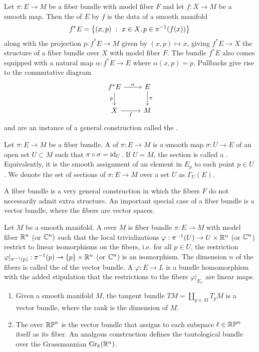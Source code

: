 \begin{defn}
Let $\pi : E \to M$ be a fiber bundle with model fiber $F$
and let $f : X \to M$ be a smooth map. Then the  of $E$ by $f$ is
the data of a smooth manifold
\[
f^*E = \left\lbrace (x, p)~:~ x \in X, p \in \pi^{-1}(f(x))  \right\rbrace
\]
along with the projection $p : f^*E \to M$ given by $(x,p) \mapsto x$, giving
$f^*E \to X$ the structure of a fiber bundle over $X$ with model fiber $F$.
The bundle $f^*E$ also comes equipped with a natural map $\alpha : f^*E \to E$
where $\alpha(x,p) = p$. Pullbacks give rise to the commutative diagram
\[\begin{tikzcd}
f^*E \ar[d, "p"']\ar[r, "\alpha"] & E \ar[d, "\pi"] \\
X \ar[r, "f"']& M
\end{tikzcd}\]
and are an instance of a general construction called the .
\end{defn}
%
\begin{defn}
Let $\pi : E \to M$ be a fiber bundle. A  of $\pi : E \to M$
is a smooth map $\sigma : U \to E$ of an open set $U \subset M$ such that
$\pi \circ \sigma = \operatorname{id}_U$. If $U = M$, the section is called a .
Equivalently, it is the smooth assignment of an element in $E_p$ to each point
$p \in U$. We denote the set of sections of $\pi : E \to M$ over a set $U$
as $\Gamma_U(E)$.
\end{defn}
%
A fiber bundle is a very general construction in which the fibers $F$ do
not necessarily admit extra structure. An important special case of a fiber bundle
is a vector bundle, where the fibers are vector spaces.
%
\begin{defn}
Let $M$ be a smooth manifold. A  over $M$ is fiber bundle
$\pi : E \to M$ with model fiber $\mathbb{R}^n$ (or $\mathbb{C}^n)$ such that the local
trivializations $\varphi : \pi^{-1}(U) \to U \times \mathbb{R}^n$ (or $\mathbb{C}^n$)
restrict to linear isomorphisms on the fibers, i.e. for all $p \in U$, the restriction
$\varphi\vert_{\pi^{-1}(p)} : \pi^{-1}(p) \to \left\lbrace p \right\rbrace \times \mathbb{R}^n$
(or $\mathbb{C}^n$) is an isomorphism. The dimension $n$ of the fibers is called the
 of the vector bundle. A 
$\varphi : E \to L$ is a bundle homomorphism with the added stipulation that
the restrictions to the fibers $\varphi\vert_{E_x}$ are linear maps.
\end{defn}
%
\begin{exmp} \enumbreak
\begin{enumerate}
  \item Given a smooth manifold $M$, the tangent bundle $TM = \coprod_{p \in M} T_pM$
  is a vector bundle, where the rank is the dimension of $M$.
  \item The  over $\mathbb{RP}^n$ is the vector bundle that
  assigns to each subspace $\ell \in \mathbb{RP}^n$ itself as its fiber. An analgous
  construction defines the tautological bundle over the Grassmannian
  $\mathrm{Gr}_k(\mathbb{R}^n)$.
\end{enumerate}
\end{exmp}

